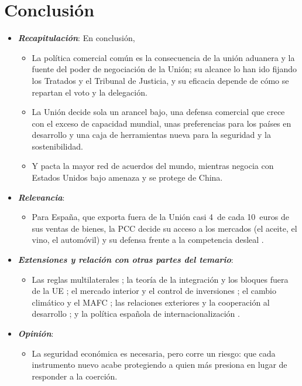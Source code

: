 \documentclass[11pt]{article}
\begin{document}
\section*{Conclusión}

\begin{itemize}
\item \textbf{\emph{Recapitulación}}: En conclusión,
  \begin{itemize}
  \item La política comercial común es la consecuencia de la unión aduanera y la fuente del poder de negociación de la Unión; su alcance lo han ido fijando los Tratados y el Tribunal de Justicia, y su eficacia depende de cómo se repartan el voto y la delegación.
  \item La Unión decide sola un arancel bajo, una defensa comercial que crece con el exceso de capacidad mundial, unas preferencias para los países en desarrollo y una caja de herramientas nueva para la seguridad y la sostenibilidad.
  \item Y pacta la mayor red de acuerdos del mundo, mientras negocia con Estados Unidos bajo amenaza y se protege de China.
  \end{itemize}
\item \textbf{\emph{Relevancia}}:
  \begin{itemize}
  \item Para España, que exporta fuera de la Unión casi 4~de cada 10~euros de sus ventas de bienes, la PCC decide su acceso a los mercados (el aceite, el vino, el automóvil) y su defensa frente a la competencia desleal  .
  \end{itemize}
\item \textbf{\emph{Extensiones y relación con otras partes del temario}}:
  \begin{itemize}
  \item Las reglas multilaterales  ; la teoría de la integración  y los bloques fuera de la UE ; el mercado interior y el control de inversiones ; el cambio climático y el MAFC ; las relaciones exteriores y la cooperación al desarrollo ; y la política española de internacionalización  .
  \end{itemize}
\item \textbf{\emph{Opinión}}:
  \begin{itemize}
  \item La seguridad económica es necesaria, pero corre un riesgo: que cada instrumento nuevo acabe protegiendo a quien más presiona en lugar de responder a la coerción.


\end{itemize}
\end{itemize}
\end{document}
